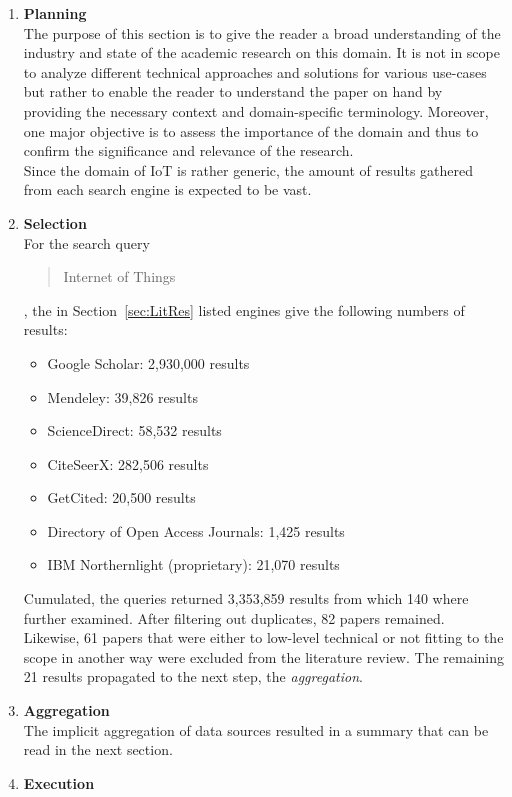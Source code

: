 \begin{enumerate}
    \item
    \textbf{Planning}\\
    The purpose of this section is to give the reader a broad understanding of the industry and state of the academic research on this domain. It is not in scope to analyze different technical approaches and solutions for various use-cases but rather to enable the reader to understand the paper on hand by providing the necessary context and domain-specific terminology. Moreover, one major objective is to assess the importance of the domain and thus to confirm the significance and relevance of the research.\\
    Since the domain of \acf{IoT} is rather generic, the amount of results gathered from each search engine is expected to be vast.
    
    \item
    \textbf{Selection}\\
    For the search query \blockquote{Internet of Things}, the in Section~\vref{sec:LitRes} listed engines give the following numbers of results:
    
    \begin{itemize}
        \renewcommand\labelitemi{--}
        \item Google Scholar: 2,930,000 results
        \item Mendeley: 39,826 results
        \item ScienceDirect: 58,532 results
        \item CiteSeerX: 282,506 results
        \item GetCited: 20,500 results
        \item Directory of Open Access Journals: 1,425 results
        \item IBM Northernlight (proprietary): 21,070 results
    \end{itemize}
    
    Cumulated, the queries returned 3,353,859 results from which 140 where further examined. After filtering out duplicates, 82 papers remained. Likewise, 61 papers that were either to low-level technical or not fitting to the scope in another way were excluded from the literature review. The remaining 21 results propagated to the next step, the \textit{aggregation}.
    
    \item
    \textbf{Aggregation}\\
    The implicit aggregation of data sources resulted in a summary that can be read in the next section.
        
    
    
    \item
        \textbf{Execution}\\
    
    
\end{enumerate}


